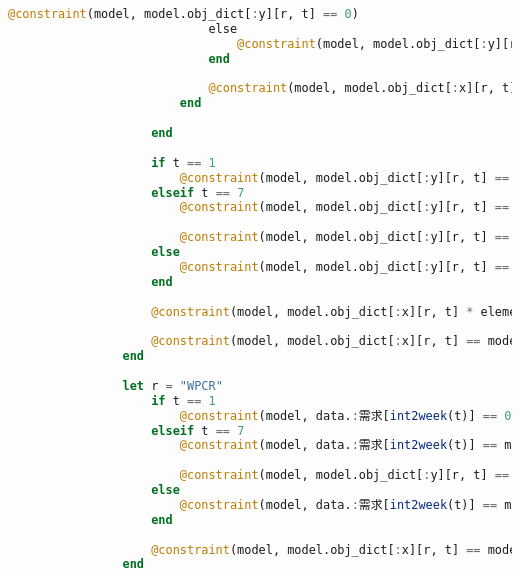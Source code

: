 \begin{appendices}
\begin{lstlisting}[language=julia]
                                @constraint(model, model.obj_dict[:y][r, t] == 0)
                            else
                                @constraint(model, model.obj_dict[:y][r, t] == model.obj_dict[:y][r, t-1] + model.obj_dict[:x][r, t] - item.:需求量[r] * model.obj_dict[:x][r⁻, t])
                            end
    
                            @constraint(model, model.obj_dict[:x][r, t] == model.obj_dict[:x][r, t] * model.obj_dict[:ω][r, t])
                        end
    
                    end
    
                    if t == 1
                        @constraint(model, model.obj_dict[:y][r, t] == 0 + model.obj_dict[:x][r, t] - product.:需求量[r] * model.obj_dict[:x][r⁻, t])
                    elseif t == 7
                        @constraint(model, model.obj_dict[:y][r, t] == model.obj_dict[:y][r, t-1] + model.obj_dict[:x][r, t] - product.:需求量[r] * model.obj_dict[:x][r⁻, t])
    
                        @constraint(model, model.obj_dict[:y][r, t] == 0)
                    else
                        @constraint(model, model.obj_dict[:y][r, t] == model.obj_dict[:y][r, t-1] + model.obj_dict[:x][r, t] - product.:需求量[r] * model.obj_dict[:x][r⁻, t])
                    end
    
                    @constraint(model, model.obj_dict[:x][r, t] * element[r].:工时消耗 == model.obj_dict[:M][r, t] * model.obj_dict[:ω][r, t])
    
                    @constraint(model, model.obj_dict[:x][r, t] == model.obj_dict[:x][r, t] * model.obj_dict[:ω][r, t])
                end
    
                let r = "WPCR"
                    if t == 1
                        @constraint(model, data.:需求[int2week(t)] == 0 + model.obj_dict[:x][r, t] - model.obj_dict[:y][r, t])
                    elseif t == 7
                        @constraint(model, data.:需求[int2week(t)] == model.obj_dict[:y][r, t-1] + model.obj_dict[:x][r, t] - model.obj_dict[:y][r, t])
    
                        @constraint(model, model.obj_dict[:y][r, t] == 0)
                    else
                        @constraint(model, data.:需求[int2week(t)] == model.obj_dict[:y][r, t-1] + model.obj_dict[:x][r, t] - model.obj_dict[:y][r, t])
                    end
    
                    @constraint(model, model.obj_dict[:x][r, t] == model.obj_dict[:x][r, t] * model.obj_dict[:ω][r, t])
                end
    

\end{lstlisting}
\end{appendices}
